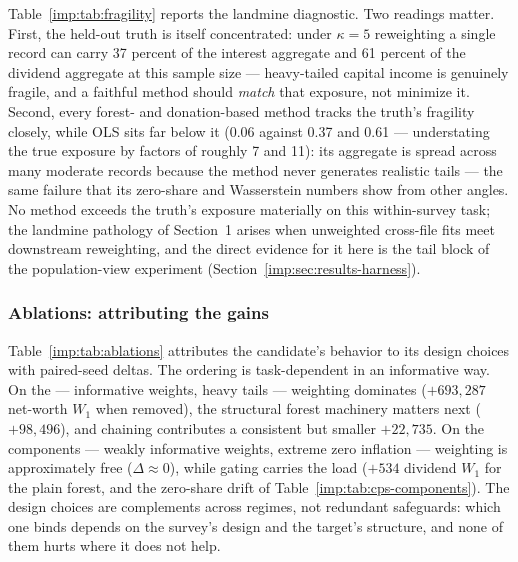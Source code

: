 Table~\ref{imp:tab:fragility} reports the landmine diagnostic. Two readings
matter. First, the held-out truth is itself concentrated: under $\kappa=5$
reweighting a single record can carry 37 percent of the interest aggregate
and 61 percent of the dividend aggregate at this sample size --- heavy-tailed
capital income is genuinely fragile, and a faithful method should
\emph{match} that exposure, not minimize it. Second, every forest- and
donation-based method tracks the truth's fragility closely, while OLS sits
far below it (0.06 against 0.37 and 0.61 --- understating the true exposure
by factors of roughly 7 and 11): its aggregate is spread across many moderate
records because the method never generates realistic tails --- the same
failure that its zero-share and Wasserstein numbers show from other angles.
No method exceeds the truth's exposure materially on this within-survey task;
the landmine pathology of Section~1 arises when unweighted cross-file fits
meet downstream reweighting, and the direct evidence for it here is the tail
block of the population-view experiment
(Section~\ref{imp:sec:results-harness}).

\subsubsection{Ablations: attributing the gains}
\label{imp:sec:results-ablations}

\begin{table}[t]
\centering
\footnotesize
\resizebox{\textwidth}{!}{}
\caption{Paired-seed deltas, ablation minus candidate (positive = ablation
worse on these lower-is-better metrics), mean over ten seeds.}
\label{imp:tab:ablations}
\end{table}

Table~\ref{imp:tab:ablations} attributes the candidate's behavior to its design
choices with paired-seed deltas. The ordering is task-dependent in an
informative way. On the \scf{} --- informative weights, heavy tails ---
weighting dominates ($+693{,}287$ net-worth $W_1$ when removed), the
structural forest machinery matters next ($+98{,}496$), and chaining
contributes a consistent but smaller $+22{,}735$. On the \cps{} components
--- weakly informative weights, extreme zero inflation --- weighting is
approximately free ($\Delta \approx 0$), while gating carries the load
($+534$ dividend $W_1$ for the plain forest, and the zero-share drift of
Table~\ref{imp:tab:cps-components}). The design choices are complements across
regimes, not redundant safeguards: which one binds depends on the survey's
design and the target's structure, and none of them hurts where it does not
help.

